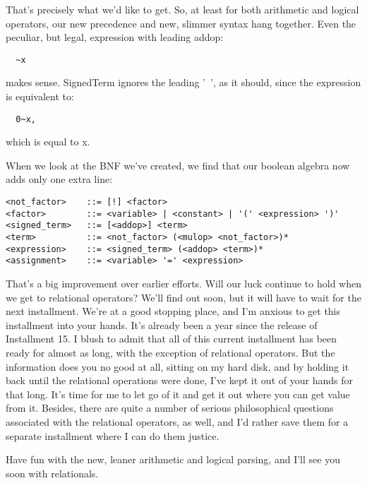 That's precisely what we'd like to get. So, at least for both arithmetic and logical operators, our new precedence and new, slimmer syntax hang together. Even the peculiar, but legal, expression with leading addop:

\begin{verbatim}
  ~x
\end{verbatim}

makes sense. SignedTerm ignores the leading '~', as it should, since the expression is equivalent to:

\begin{verbatim}
  0~x,
\end{verbatim}

which is equal to x.

When we look at the BNF we've created, we find that our boolean algebra now adds only one extra line:

\begin{verbatim}
<not_factor>    ::= [!] <factor>
<factor>        ::= <variable> | <constant> | '(' <expression> ')'
<signed_term>   ::= [<addop>] <term>
<term>          ::= <not_factor> (<mulop> <not_factor>)*
<expression>    ::= <signed_term> (<addop> <term>)*
<assignment>    ::= <variable> '=' <expression>
\end{verbatim}

That's a big improvement over earlier efforts. Will our luck continue to hold when we get to relational operators?  We'll find out soon, but it will have to wait for the next installment. We're at a good stopping place, and I'm anxious to get this installment into your hands. It's already been a year since the release of Installment 15. I blush to admit that all of this current installment has been ready for almost as long, with the exception of relational operators. But the information does you no good at all, sitting on my hard disk, and by holding it back until the relational operations were done, I've kept it out of your hands for that long. It's time for me to let go of it and get it out where you can get value from it. Besides, there are quite a number of serious philosophical questions associated with the relational operators, as well, and I'd rather save them for a separate installment where I can do them justice.

Have fun with the new, leaner arithmetic and logical parsing, and I'll see you soon with relationals.
